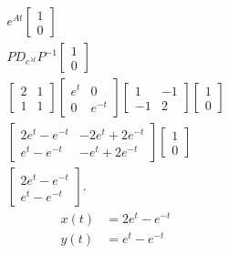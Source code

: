 \documentclass{zc-ust-hw}
\begin{document}
\begin{enumerate}
\begin{enumerate}
\begin{sol}
\begin{gather}
          e^{At} \begin{bmatrix} 1\\0 \end{bmatrix} \\
          P D_{e^{\lambda t}} P^{-1} \begin{bmatrix} 1\\0 \end{bmatrix} \\
          \begin{bmatrix} 2&1\\1&1 \end{bmatrix} \begin{bmatrix} e^{t}&0\\0&e^{-t} \end{bmatrix} \begin{bmatrix} 1&-1\\-1&2 \end{bmatrix} \begin{bmatrix} 1\\0 \end{bmatrix} \\
          \begin{bmatrix} 2e^{t}-e^{-t} & -2e^{t}+2e^{-t}\\ e^{t}-e^{-t}&-e^{t}+2e^{-t} \end{bmatrix} \begin{bmatrix} 1\\0 \end{bmatrix} \\
          \begin{bmatrix} 2e^{t}-e^{-t}\\ e^{t}-e^{-t} \end{bmatrix} 
        .\end{gather}
        \begin{align}
          x(t) &= 2e^{t}-e^{-t} \\
          y(t) &= e^{t}-e^{-t}
        \end{align}
      \end{sol}
  \end{enumerate}

\end{enumerate}
\end{document}
